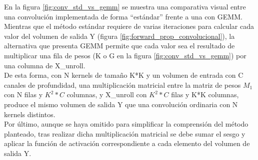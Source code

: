 En la figura \ref{fig:conv_std_vs_gemm} se muestra una comparativa visual entre una convolución implementada de forma ``estándar'' frente a una con GEMM. \\
Mientras que el método estándar requiere de varias iteraciones para calcular cada valor del volumen de salida Y (figura \ref{fig:forward_prop_convolucional}), la alternativa que presenta GEMM permite que cada valor sea el resultado de multiplicar una fila de pesos (K o G en la figura \ref{fig:conv_std_vs_gemm}) por una columna de X\_unroll. \cite{Programming_Massively} \\
De esta forma, con N kernels de tamaño K*K y un volumen de entrada con C canales de profundidad, una multiplicación matricial entre la matriz de pesos $M_1$ con N filas y $K^2*C$ columnas, y X\_unroll con $K^2*C$ filas y K*K columnas, produce el mismo volumen de salida Y que una convolución ordinaria con N kernels distintos. \\
Por último, aunque se haya omitido para simplificar la comprensión del método planteado, tras realizar dicha multiplicación matricial se debe sumar el sesgo y aplicar la función de activación correspondiente a cada elemento del volumen de salida Y.
